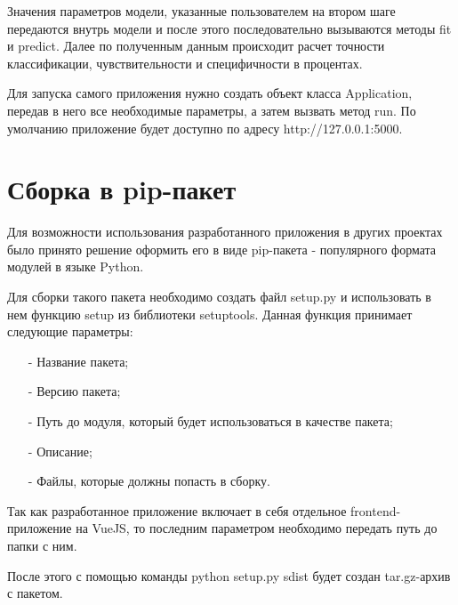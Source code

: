 Значения параметров модели, указанные пользователем на втором шаге передаются внутрь модели и после этого последовательно вызываются методы fit и predict. Далее по полученным данным происходит расчет точности классификации, чувствительности и специфичности в процентах.


Для запуска самого приложения нужно создать объект класса Application, передав в него все необходимые параметры, а затем вызвать метод run. По умолчанию приложение будет доступно по адресу http://127.0.0.1:5000.

\section{Сборка в pip-пакет}

Для возможности использования разработанного приложения в других проектах было принято решение оформить его в виде pip-пакета - популярного формата модулей в языке Python.


Для сборки такого пакета необходимо создать файл setup.py и использовать в нем функцию setup из библиотеки setuptools. Данная функция принимает следующие параметры:
\begin{itemize}
	\item[-] Название пакета;
	\item[-] Версию пакета;
	\item[-] Путь до модуля, который будет использоваться в качестве пакета;
	\item[-] Описание;
	\item[-] Файлы, которые должны попасть в сборку.
\end{itemize}


Так как разработанное приложение включает в себя отдельное frontend-приложение на VueJS, то последним параметром необходимо передать путь до папки с ним.


После этого с помощью команды python setup.py sdist будет создан tar.gz-архив с пакетом.